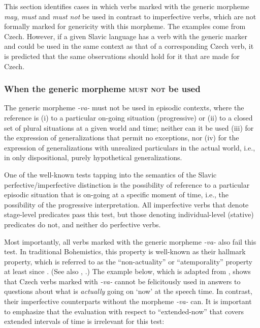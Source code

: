 \documentclass[output=paper,colorlinks,citecolor=brown]{langscibook}
\begin{document}
This section identifies cases in which
verbs marked with the generic morpheme \textit{may},
\textit{must} and \textit{must not}
be used in contrast to imperfective verbs, which are not formally marked for genericity with this morpheme.
The examples come from Czech. However, if a given Slavic language
has a verb with the generic marker and could be used in the same context as that of a corresponding Czech verb, it is predicted that the same observations
should hold for it that are made for Czech.


\subsubsection{When the generic morpheme \textsc{must not} be used}\label{mustnotbeused}

\noindent
The generic morpheme \textit{-va-} must not be used in episodic contexts, where the reference is (i) to a particular on-going situation (progressive) or
(ii) to a closed set of plural situations at a given world and time; neither can it be used
(iii) for the expression of generalizations that permit no exceptions, nor (iv)
for the expression of generalizations with unrealized particulars in the actual world, i.e., in only dispositional, purely hypothetical generalizations.



One of the well-known tests tapping into the semantics of the Slavic
perfective/imperfective distinction is the possibility
of reference to a particular episodic situation that is on-going at a specific moment of time,  i.e.,  the possibility of the progressive interpretation. All imperfective verbs that denote stage-level predicates pass this test, but those denoting individual-level (stative) predicates do not, and neither do perfective verbs.

Most importantly, all verbs marked with the generic morpheme \textit{-va-} also fail this test.
In traditional Bohemistics, this property is well-known as their hallmark property,
which is referred to as the ``non-actuality'' or ``atemporality'' property at least since \citet{kopecny1948}. (See also \citealt{kopecny1962,kopecny1965}, \citealt[259]{kopecny1966}.)
The example below, which is adapted from \citet{kopecny1948},
shows that Czech verbs marked with \textit{-va-} cannot be felicitously used in answers to questions about what is \textit{actually} going on `now' at the speech time. In contrast,
their imperfective counterparts without the morpheme \textit{-va-} can.
It is important to emphasize
that the evaluation with respect to ``extended-now'' that covers extended intervals of time is irrelevant for this test:
\end{document}
